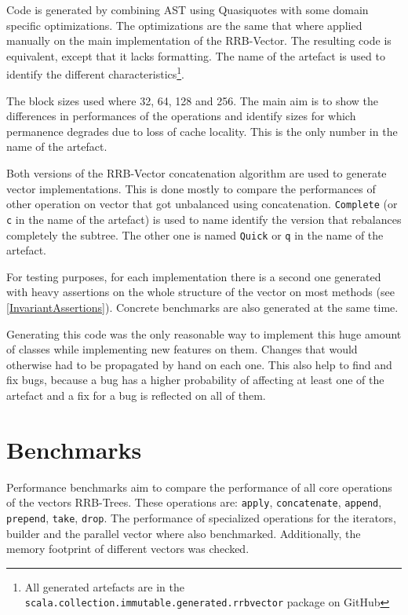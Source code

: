 Code is generated by combining AST using Quasiquotes with some domain specific optimizations. The optimizations are the same that where applied manually on the main implementation of the RRB-Vector. The resulting code is equivalent, except that it lacks formatting. The name of the artefact is used to identify the different characteristics\footnote{All generated artefacts are in the \texttt{scala.collection.immutable.generated.rrbvector} package on GitHub}.

The block sizes used where 32, 64, 128 and 256. The main aim is to show the differences in performances of the operations and identify sizes for which permanence degrades due to loss of cache locality. This is the only number in the name of the artefact.

Both versions of the RRB-Vector concatenation algorithm are used to generate vector implementations. This is done mostly to compare the performances of other operation on vector that got unbalanced using concatenation. \texttt{Complete} (or \texttt{c} in the name of the artefact) is used to name identify the version that rebalances completely the subtree. The other one is named \texttt{Quick} or \texttt{q} in the name of the artefact.

For testing purposes, for each implementation there is a second one generated with heavy assertions on the whole structure of the vector on most methods (see \ref{InvariantAssertions}). 
Concrete benchmarks are also generated at the same time.

Generating this code was the only reasonable way to implement this huge amount of classes while implementing new features on them. 
Changes that would otherwise had to be propagated by hand on each one. 
This also help to find and fix bugs, because a bug has a higher probability of affecting at least one of the artefact and a fix for a bug is reflected on all of them.

\clearpage
\section{Benchmarks}
\label{Benchmarks}

Performance benchmarks aim to compare the performance of all core operations of the vectors RRB-Trees. These operations are: \texttt{apply}, \texttt{concatenate}, \texttt{append}, \texttt{prepend}, \texttt{take}, \texttt{drop}. The performance of specialized operations for the iterators, builder and the parallel vector where also benchmarked. Additionally, the memory footprint of different vectors was checked.


